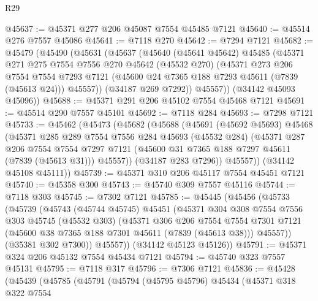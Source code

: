 \begin{lexlean}{R29}
\begin{coremodule}
@45637 := @45371 @277 @206 @45087 @7554 @45485 @7121
@45640 := @45514 @276 @7557 @45086
@45641 := @7118 @270
@45642 := @7294 @7121
@45682 := @45479
    (@45490
      (@45631
        (@45637
          (@45640
            (@45641 @45642)
            @45485
            (@45371
              @271
              @275
              @7554
              @7556
              @270
              @45642
              (@45532 @270)
              (@45371
                @273
                @206
                @7554
                @7554
                @7293
                @7121
                (@45600 @24 @7365 @188 @7293 @45611 (@7839 (@45613 @24)))
                @45557))
            (@34187 @269 @7292))
          @45557))
      (@34142 @45093 @45096))
@45688 := @45371 @291 @206 @45102 @7554 @45468 @7121
@45691 := @45514 @290 @7557 @45101
@45692 := @7118 @284
@45693 := @7298 @7121
@45733 := @45462
    (@45473
      (@45682
        (@45688
          (@45691
            (@45692 @45693)
            @45468
            (@45371
              @285
              @289
              @7554
              @7556
              @284
              @45693
              (@45532 @284)
              (@45371
                @287
                @206
                @7554
                @7554
                @7297
                @7121
                (@45600 @31 @7365 @188 @7297 @45611 (@7839 (@45613 @31)))
                @45557))
            (@34187 @283 @7296))
          @45557))
      (@34142 @45108 @45111))
@45739 := @45371 @310 @206 @45117 @7554 @45451 @7121
@45740 := @45358 @300
@45743 := @45740 @309 @7557 @45116
@45744 := @7118 @303
@45745 := @7302 @7121
@45785 := @45445
    (@45456
      (@45733
        (@45739
          (@45743
            (@45744 @45745)
            @45451
            (@45371
              @304
              @308
              @7554
              @7556
              @303
              @45745
              (@45532 @303)
              (@45371
                @306
                @206
                @7554
                @7554
                @7301
                @7121
                (@45600 @38 @7365 @188 @7301 @45611 (@7839 (@45613 @38)))
                @45557))
            (@35381 @302 @7300))
          @45557))
      (@34142 @45123 @45126))
@45791 := @45371 @324 @206 @45132 @7554 @45434 @7121
@45794 := @45740 @323 @7557 @45131
@45795 := @7118 @317
@45796 := @7306 @7121
@45836 := @45428
    (@45439
      (@45785
        (@45791
          (@45794
            (@45795 @45796)
            @45434
            (@45371
              @318
              @322
              @7554

\end{coremodule}
\end{lexlean}
